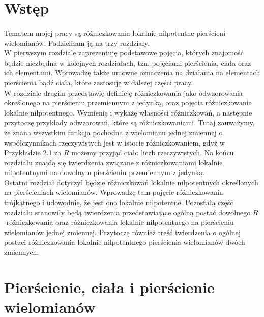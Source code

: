 \documentclass[12pt,a4paper]{article}
\numberwithin{equation}{section}
\begin{document}



\tableofcontents

 
\newpage
\section*{Wstęp}
\paragraph{}
\indent
Tematem mojej pracy są różniczkowania lokalnie nilpotentne pierścieni wielomianów. Podzieliłam ją na trzy rozdziały.\\
\indent W pierwszym rozdziale zaprezentuję podstawowe pojęcia, których znajomość będzie niezbędna w kolejnych rozdziałach, tzn. pojęciami pierścienia, ciała oraz ich elementami. Wprowadzę także umowne oznaczenia na działania na elementach pierścienia bądź ciała, które zastosuję w dalszej części pracy.\\
\indent W rozdziale drugim przedstawię definicję różniczkowania jako odwzorowania określonego na pierścieniu przemiennym z jedynką, oraz pojęcia różniczkowania lokalnie nilpotentnego. Wymienię i wykażę własności różniczkowań, a następnie przytoczę przykłady odwzorowań, które są różniczkowaniami. Tutaj zauważymy, że znana wszystkim funkcja pochodna z wielomianu jednej zmiennej o współczynnikach rzeczywistych jest w istocie różniczkowaniem, gdyż w Przykładzie 2.1 za $R$ możemy przyjąć ciało liczb rzeczywistych. Na końcu rozdziału znajdą się twierdzenia związane z różniczkowaniami lokalnie nilpotentnymi na dowolnym pierścieniu przemiennym z jedynką.\\
\indent
 Ostatni rozdział dotyczył będzie różniczkowań lokalnie nilpotentnych określonych na pierścieniach wielomianów. Wprowadzę  
tam pojęcie różniczkowania trójkątnego i udowodnię, że jest ono lokalnie nilpotentne. Pozostałą część rozdziału stanowiły będą twierdzenia przedstawiające ogólną postać dowolnego $R$-różniczkowania oraz różniczkowania lokalnie nilpotentnego na pierścieniu wielomianów jednej zmiennej. Przytoczę również treść twierdzenia o ogólnej postaci różniczkowania lokalnie nilpotentnego pierścienia wielomianów dwóch zmiennych.


\newpage
\section{Pierścienie, ciała i pierścienie wielomianów}
\end{document}
